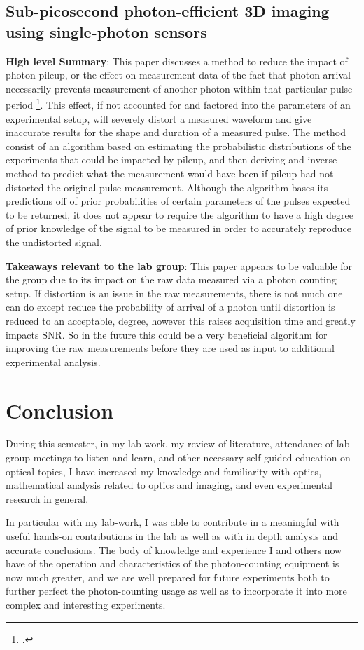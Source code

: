 \documentclass[a4paper]{article}
\begin{document}
\subsection{Sub-picosecond photon-efficient 3D imaging using single-photon sensors}
\textbf{High level Summary}: This paper discusses a method to reduce the impact of photon pileup, or the effect on measurement data of the fact that photon arrival necessarily prevents measurement of another photon within that particular pulse period \footcite{Heide2018}. This effect, if not accounted for and factored into the parameters of an experimental setup, will severely distort a measured waveform and give inaccurate results for the shape and duration of a measured pulse. The method consist of an algorithm based on estimating the probabilistic distributions of the experiments that could be impacted by pileup, and then deriving and inverse method to predict what the measurement would have been if pileup had not distorted the original pulse measurement. Although the algorithm bases its predictions off of prior probabilities of certain parameters of the pulses expected to be returned, it does not appear to require the algorithm to have a high degree of prior knowledge of the signal to be measured in order to accurately reproduce the undistorted signal.

\textbf{Takeaways relevant to the lab group}: This paper appears to be valuable for the group due to its impact on the raw data measured via a photon counting setup. If distortion is an issue in the raw measurements, there is not much one can do except reduce the probability of arrival of a photon until distortion is reduced to an acceptable, degree, however this raises acquisition time and greatly impacts SNR. So in the future this could be a very beneficial algorithm for improving the raw measurements before they are used as input to additional experimental analysis.

\section{Conclusion}

During this semester, in my lab work, my review of literature, attendance of lab group meetings to listen and learn, and other necessary self-guided education on optical topics, I have increased my knowledge and familiarity with optics, mathematical analysis related to optics and imaging, and even experimental research in general.

In particular with my lab-work, I was able to contribute in a meaningful with useful hands-on contributions in the lab as well as with in depth analysis and accurate conclusions. The body of knowledge and experience I and others now have of the operation and characteristics of the photon-counting equipment is now much greater, and we are well prepared for future experiments both to further perfect the photon-counting usage as well as to incorporate it into more complex and interesting experiments.
\end{document}
